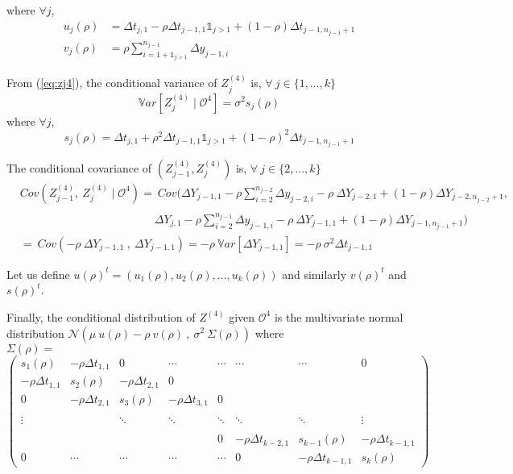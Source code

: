 \noindent where $\forall j$,
\begin{align*}
u_j(\rho) &= \Delta t_{j,1}-\rho \Delta t_{j-1,1} \mathds{1}_{j>1}+(1-\rho)\Delta t_{j-1,n_{j-1}+1}\\
v_j(\rho) &= \rho \sum\limits_{i=1+\mathds{1}_{j>1}}^{n_{j-1}} \Delta y_{j-1,i}
\end{align*}

\noindent From (\ref{eq:zj4}), the conditional variance of $Z_j^{(4)}$ is, $\forall\ j \in \{1,...,k\}$
\begin{equation}
\mathbb{V}ar\left[Z_j^{(4)} \mid \mathcal{O}^4\right]= \sigma^2 s_j(\rho)
\label{eq:varzj4}
\end{equation}
\noindent where $\forall j$,
$$s_j(\rho) = \Delta t_{j,1}+\rho^2 \Delta t_{j-1,1} \mathds{1}_{j>1}+(1-\rho)^2 \Delta t_{j-1,n_{j-1}+1}$$

\noindent The conditional covariance of $(Z_{j-1}^{(4)},Z_j^{(4)})$ is, $\forall\ j \in \{2,...,k\}$
\begin{align}
&Cov\left(Z_{j-1}^{(4)},\ Z_j^{(4)} \mid \mathcal{O}^4  \right)
= \ Cov (\Delta Y_{j-1,1}-\rho \sum\limits_{i=2}^{n_{j-2}} \Delta y_{j-2,i}-\rho\ \Delta Y_{j-2,1} +(1-\rho)\Delta Y_{j-2,n_{j-2}+1},\nonumber\\
& \phantom{Cov\left(Z_{j-1}^4,\ Z_j^{(4)} \mid \mathcal{O}^4  \right)
=}\Delta Y_{j,1} -\rho \sum\limits_{i=2}^{n_{j-1}} \Delta  y_{j-1,i}-\rho\ \Delta Y_{j-1,1} 
+(1-\rho)\Delta Y_{j-1,n_{j-1}+1} ) \nonumber\\
&= \ Cov(-\rho\ \Delta Y_{j-1,1}\ ,\ \Delta Y_{j-1,1}) =-\rho\ \mathbb{V}ar [ \Delta Y_{j-1,1}] 
= -\rho\ \sigma^2 \Delta t_{j-1,1}
\end{align}

\noindent Let us define 
$u(\rho)^t = (u_1(\rho),u_2(\rho),...,u_{k}(\rho)) $ and similarly $v(\rho)^t$ and $s(\rho)^t$.

\noindent Finally, the conditional distribution of $Z^{(4)}$ given $\mathcal{O}^4$ is the multivariate normal distribution $\mathcal{N}(\mu\ u(\rho) -\rho\ v(\rho)\ , \ \sigma^2\ \Sigma(\rho))$ 
where
\\

$ \Sigma(\rho)=$
$\begin{pmatrix} 
s_1(\rho) & -\rho \Delta t_{1,1} & 0 & \cdots&\cdots &  \cdots &\cdots & 0\\ 
-\rho \Delta t_{1,1} & s_2(\rho) & -\rho \Delta t_{2,1}  &0&& & & \\
0&-\rho \Delta t_{2,1} & s_3(\rho) & -\rho \Delta t_{3,1}  &0& & & \\
&&&&&&\\
\vdots&&\ddots&\ddots & \ddots & \ddots  &\ddots & \vdots\\
&&&&&&\\
&&&&0&-\rho \Delta t_{k-2,1} & s_{k-1}(\rho) & -\rho \Delta t_{k-1,1}  \\

0&\cdots& \cdots& \cdots& \cdots&0& -\rho \Delta t_{k-1,1} &s_{k}(\rho)

\end{pmatrix}$\\[1.3 cm]


